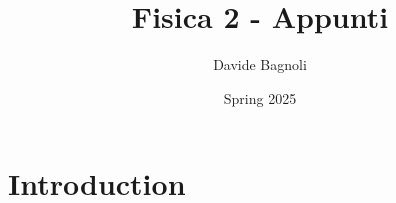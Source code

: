 \documentclass[12pt,a4paper]{article}
\title{Fisica 2 - Appunti}
\author{Davide Bagnoli}
\date{Spring 2025}
\begin{document}
\maketitle
\tableofcontents
\newpage

\section{Introduction}
\end{document}
